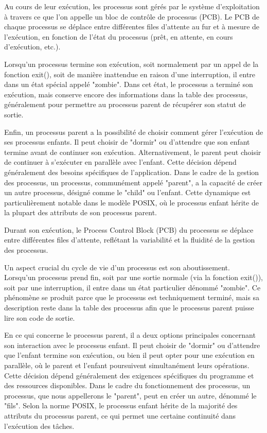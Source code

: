 \documentclass[12pt]{article}
\begin{document}
Au cours de leur exécution, les processus sont gérés par le système d'exploitation à travers ce que l'on appelle un bloc de contrôle de processus (PCB). Le PCB de chaque processus se déplace entre différentes files d'attente au fur et à mesure de l'exécution, en fonction de l'état du processus (prêt, en attente, en cours d'exécution, etc.).

Lorsqu'un processus termine son exécution, soit normalement par un appel de la fonction exit(), soit de manière inattendue en raison d'une interruption, il entre dans un état spécial appelé "zombie". Dans cet état, le processus a terminé son exécution, mais conserve encore des informations dans la table des processus, généralement pour permettre au processus parent de récupérer son statut de sortie.

Enfin, un processus parent a la possibilité de choisir comment gérer l'exécution de ses processus enfants. Il peut choisir de "dormir" ou d'attendre que son enfant termine avant de continuer son exécution. Alternativement, le parent peut choisir de continuer à s'exécuter en parallèle avec l'enfant. Cette décision dépend généralement des besoins spécifiques de l'application.
Dans le cadre de la gestion des processus, un processus, communément appelé "parent", a la capacité de créer un autre processus, désigné comme le "child" ou l'enfant. Cette dynamique est particulièrement notable dans le modèle POSIX, où le processus enfant hérite de la plupart des attributs de son processus parent. 

Durant son exécution, le Process Control Block (PCB) du processus se déplace entre différentes files d'attente, reflétant la variabilité et la fluidité de la gestion des processus. 

Un aspect crucial du cycle de vie d'un processus est son aboutissement. Lorsqu'un processus prend fin, soit par une sortie normale (via la fonction exit()), soit par une interruption, il entre dans un état particulier dénommé "zombie". Ce phénomène se produit parce que le processus est techniquement terminé, mais sa description reste dans la table des processus afin que le processus parent puisse lire son code de sortie.

En ce qui concerne le processus parent, il a deux options principales concernant son interaction avec le processus enfant. Il peut choisir de "dormir" ou d'attendre que l'enfant termine son exécution, ou bien il peut opter pour une exécution en parallèle, où le parent et l'enfant poursuivent simultanément leurs opérations. Cette décision dépend généralement des exigences spécifiques du programme et des ressources disponibles.
Dans le cadre du fonctionnement des processus, un processus, que nous appellerons le "parent", peut en créer un autre, dénommé le "fils". Selon la norme POSIX, le processus enfant hérite de la majorité des attributs du processus parent, ce qui permet une certaine continuité dans l'exécution des tâches.
\end{document}
